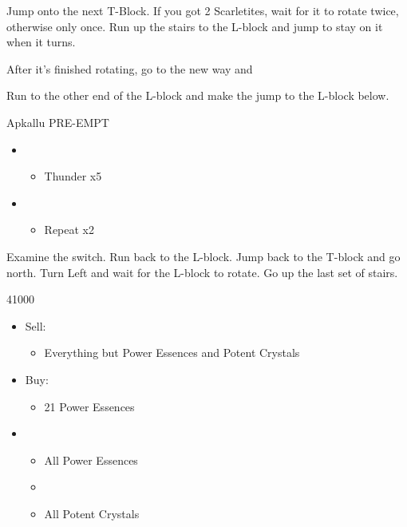 Jump onto the next T-Block. If you got 2 Scarletites, wait for it to rotate twice, otherwise only once. Run up the stairs to the L-block and jump to stay on it when it turns.

After it's finished rotating, go to the new way and 

Run to the other end of the L-block and make the jump to the L-block below.

\begin{battle}{Apkallu PRE-EMPT}
  \begin{flushleft}
    \begin{itemize}
      \item \sixth
            \begin{itemize}
              \item Thunder x5
            \end{itemize}
      \item \fifth
            \begin{itemize}
              \item Repeat x2
            \end{itemize}
    \end{itemize}
  \end{flushleft}
\end{battle}

Examine the switch. Run back to the L-block. Jump back to the T-block and go north. Turn Left and wait for the L-block to rotate. Go up the last set of stairs.

\begin{shop}{41000}
  \begin{itemize}
    \item Sell:
          \begin{itemize}
            \item Everything but Power Essences and Potent Crystals
          \end{itemize}
    \item Buy:
          \begin{itemize}
            \item 21 Power Essences
          \end{itemize}
  \end{itemize}
\end{shop}
\begin{menu}
  \begin{itemize}
    \crystarium
    \begin{itemize}
      \item \chu
            \begin{itemize}
              \item All Power Essences
              \item {}
              \item All Potent Crystals
            \end{itemize}
    \end{itemize}
  \end{itemize}
\end{menu}

